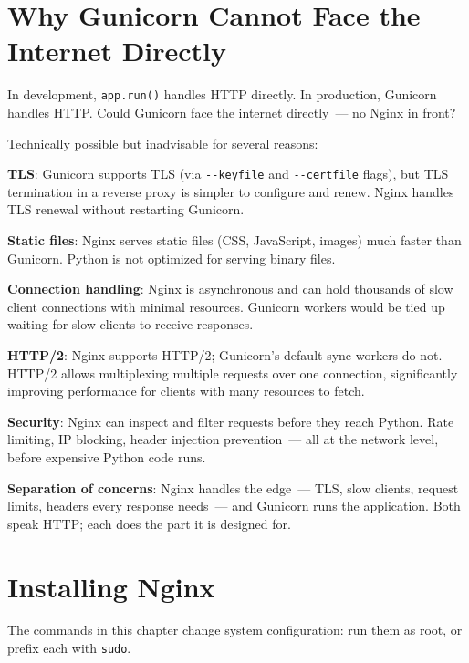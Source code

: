 \setcounter{section}{0}
\section{Why Gunicorn Cannot Face the Internet Directly}\label{28-traffic-routing:281-why-gunicorn-cannot-face-the-internet-directly}

In development, \texttt{app.run()} handles HTTP directly. In production, Gunicorn handles HTTP. Could Gunicorn face the internet directly~--- no Nginx in front?

Technically possible but inadvisable for several reasons:

\textbf{TLS}: Gunicorn supports TLS (via \texttt{-\/-keyfile} and \texttt{-\/-certfile} flags), but TLS termination in a reverse proxy is simpler to configure and renew. Nginx handles TLS renewal without restarting Gunicorn.

\textbf{Static files}: Nginx serves static files (CSS, JavaScript, images) much faster than Gunicorn. Python is not optimized for serving binary files.

\textbf{Connection handling}: Nginx is asynchronous and can hold thousands of slow client connections with minimal resources. Gunicorn workers would be tied up waiting for slow clients to receive responses.

\textbf{HTTP/2}: Nginx supports HTTP/2; Gunicorn's default sync workers do not. HTTP/2 allows multiplexing multiple requests over one connection, significantly improving performance for clients with many resources to fetch.

\textbf{Security}: Nginx can inspect and filter requests before they reach Python. Rate limiting, IP blocking, header injection prevention~--- all at the network level, before expensive Python code runs.

\textbf{Separation of concerns}: Nginx handles the edge~--- TLS, slow clients, request limits, headers every response needs~--- and Gunicorn runs the application. Both speak HTTP; each does the part it is designed for.

\setcounter{section}{1}
\section{Installing Nginx}\label{28-traffic-routing:282-installing-nginx}

The commands in this chapter change system configuration: run them as root, or prefix each with \texttt{sudo}.

